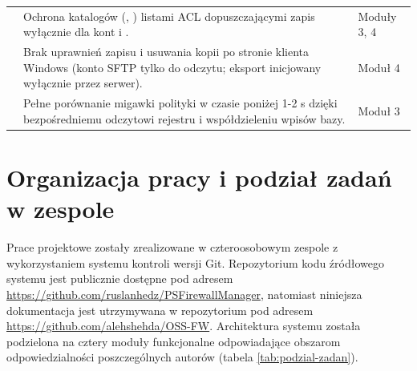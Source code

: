 \begin{table}[H]
\begin{tabularx}{\linewidth}{C{1.6cm} Y C{2.2cm}}
         & Ochrona katalogów (, ) listami ACL dopuszczającymi zapis wyłącznie dla kont  i . & Moduły 3, 4 \\
         & Brak uprawnień zapisu i usuwania kopii po stronie klienta Windows (konto SFTP tylko do odczytu; eksport inicjowany wyłącznie przez serwer). & Moduł 4 \\
         & Pełne porównanie migawki polityki w czasie poniżej 1-2 s dzięki bezpośredniemu odczytowi rejestru i współdzieleniu wpisów bazy. & Moduł 3 \\
        \bottomrule
    \end{tabularx}
\end{table}

\section{Organizacja pracy i podział zadań w zespole}\label{sec:podzial-zadan}

Prace projektowe zostały zrealizowane w czteroosobowym zespole z wykorzystaniem systemu kontroli wersji Git. Repozytorium kodu źródłowego systemu \cite{psfirewallmanager-repo} jest publicznie dostępne pod adresem \url{https://github.com/ruslanhedz/PSFirewallManager}, natomiast niniejsza dokumentacja jest utrzymywana w repozytorium \cite{oss-fw-repo} pod adresem \url{https://github.com/alehshehda/OSS-FW}. Architektura systemu została podzielona na cztery moduły funkcjonalne odpowiadające obszarom odpowiedzialności poszczególnych autorów (tabela \ref{tab:podzial-zadan}).

